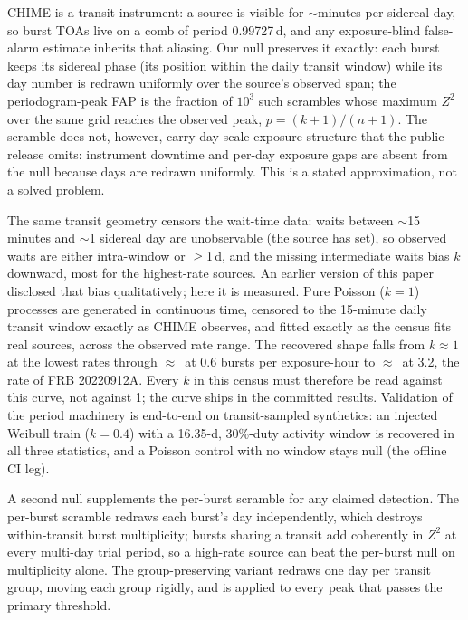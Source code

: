 \documentclass[twocolumn]{aastex631}
\begin{document}
CHIME is a transit instrument: a source is visible for $\sim$minutes per sidereal day, so
burst TOAs live on a comb of period 0.99727\,d, and any exposure-blind false-alarm estimate
inherits that aliasing. Our null preserves it exactly: each burst keeps its sidereal phase
(its position within the daily transit window) while its day number is redrawn uniformly over
the source's observed span; the periodogram-peak FAP is the fraction of $10^3$ such scrambles
whose maximum $Z^2$ over the same grid reaches the observed peak, $p=(k{+}1)/(n{+}1)$. The
scramble does not, however, carry day-scale exposure structure that the public release omits:
instrument downtime and per-day exposure gaps are absent from the null because days are
redrawn uniformly. This is a stated approximation, not a solved problem.

The same transit geometry censors the wait-time data: waits between $\sim$15 minutes and
$\sim$1 sidereal day are unobservable (the source has set), so observed waits are either
intra-window or $\ge$1\,d, and the missing intermediate waits bias $k$ downward, most for the
highest-rate sources. An earlier version of this paper disclosed that bias qualitatively; here
it is measured. Pure Poisson ($k=1$) processes are generated in continuous time, censored to
the 15-minute daily transit window exactly as CHIME observes, and fitted exactly as the census
fits real sources, across the observed rate range. The recovered shape falls from
$k\approx1$ at the lowest rates through $\approx$\fwRealBiasKMidRate\ at 0.6 bursts per
exposure-hour to $\approx$\fwRealBiasKHiRate\ at 3.2, the rate of FRB 20220912A. Every $k$
in this census must therefore be read against this curve, not against 1; the curve ships in
the committed results. Validation of the period machinery is end-to-end on transit-sampled
synthetics: an injected Weibull train ($k=0.4$) with a 16.35-d, 30\%-duty activity window is
recovered in all three statistics, and a Poisson control with no window stays null (the
offline CI leg).

A second null supplements the per-burst scramble for any claimed detection. The per-burst
scramble redraws each burst's day independently, which destroys within-transit burst
multiplicity; bursts sharing a transit add coherently in $Z^2$ at every multi-day trial
period, so a high-rate source can beat the per-burst null on multiplicity alone. The
group-preserving variant redraws one day per transit group, moving each group rigidly, and is
applied to every peak that passes the primary threshold.
\end{document}
